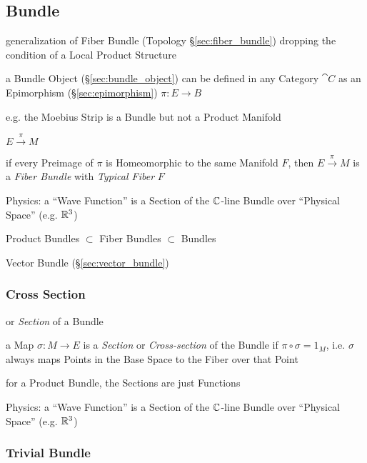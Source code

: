 \subsection{Bundle}\label{sec:bundle}

generalization of Fiber Bundle (Topology \S\ref{sec:fiber_bundle}) dropping the
condition of a Local Product Structure

a Bundle Object (\S\ref{sec:bundle_object}) can be defined in any Category
$\cat{C}$ as an Epimorphism (\S\ref{sec:epimorphism}) $\pi : E \to B$

e.g. the Moebius Strip is a Bundle but not a Product Manifold

$E \xrightarrow{\pi} M$

if every Preimage of $\pi$ is Homeomorphic to the same Manifold $F$, then $E
\xrightarrow{\pi} M$ is a \emph{Fiber Bundle} with \emph{Typical Fiber} $F$

Physics: a ``Wave Function'' is a Section of the $\mathbb{C}$-line Bundle over
``Physical Space'' (e.g. $\mathbb{R}^3$)

Product Bundles $\subset$ Fiber Bundles $\subset$ Bundles

Vector Bundle (\S\ref{sec:vector_bundle})




\subsubsection{Cross Section}\label{sec:cross_section}

or \emph{Section} of a Bundle

a Map $\sigma : M \to E$ is a \emph{Section} or \emph{Cross-section} of
the Bundle if $\pi \circ \sigma = 1_M$, i.e. $\sigma$ always maps Points in the
Base Space to the Fiber over that Point

for a Product Bundle, the Sections are just Functions

Physics: a ``Wave Function'' is a Section of the $\mathbb{C}$-line Bundle over
``Physical Space'' (e.g. $\mathbb{R}^3$)



\subsubsection{Trivial Bundle}\label{sec:trivial_bundle}

